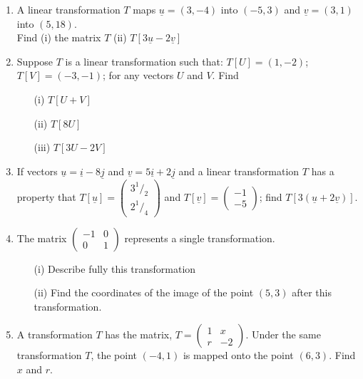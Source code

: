 \begin{enumerate}
	\item A linear transformation $T$ maps $\underline{u} = (3,-4)$ into $(-5,3)$ and $\underline{v} = (3,1)$ into $(5,18)$.\\
	Find (i) the matrix $T$ \quad (ii) $T\left[3\underline{u} - 2\underline{v}\right]$
	
	\item Suppose $T$ is a linear transformation such that: $T\left[U\right] = (1,-2)$; $T\left[V\right] = (-3,-1)$; for any vectors $U$ and $V$. Find
		\begin{itemize}
		\item[(i)] $T\left[U + V\right]$
		\item[(ii)] $T\left[8U\right]$
		\item[(iii)] $T\left[3U - 2V\right]$
		\end{itemize}
		
	\item If vectors $\underline{u} = \underline{i} - 8\underline{j}$ and $\underline{v} = 5\underline{i} + 2\underline{j}$ and a linear transformation $T$ has a property that $T\left[\underline{u}\right] = 
	\begin{pmatrix}
	3^1/_2 \\
	2^1/_4
	\end{pmatrix}$ and $T\left[\underline{v}\right] = 
	\begin{pmatrix}
	-1 \\
	-5
	\end{pmatrix}$; find $T\left[3(\underline{u} + 2\underline{v})\right]$.
		
	\item The matrix $
	\begin{pmatrix}
	-1 & 0 \\
	0 & 1
	\end{pmatrix}$ represents a single transformation.
		\begin{itemize}
		\item[(i)] Describe fully this transformation
		\item[(ii)] Find the coordinates of the image of the point $(5,3)$ after this transformation.
		\end{itemize}
		
	\item A transformation $T$ has the matrix, $T = 
	\begin{pmatrix}
	1 & x \\
	r & -2
	\end{pmatrix}$. Under the same transformation $T$, the point $(-4,1)$ is mapped onto the point $(6,3)$. Find $x$ and $r$.
		

\end{enumerate}
